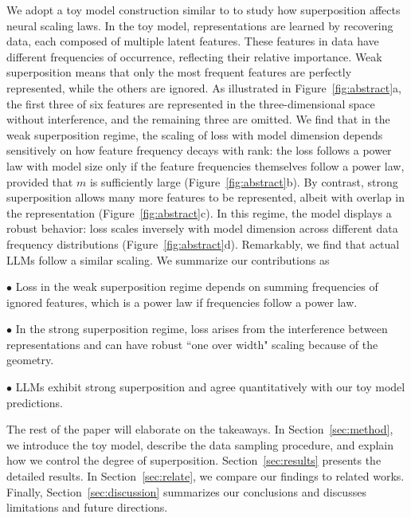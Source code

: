 \documentclass{article}
\begin{document}
We adopt a toy model construction similar to \cite{elhage2022superposition} to study how superposition affects neural scaling laws. In the toy model, representations are learned by recovering data, each composed of multiple latent features. These features in data have different frequencies of occurrence, reflecting their relative importance. Weak superposition means that only the most frequent features are perfectly represented, while the others are ignored. As illustrated in Figure~\ref{fig:abstract}a, the first three of six features are represented in the three-dimensional space without interference, and the remaining three are omitted. We find that in the weak superposition regime, the scaling of loss with model dimension depends sensitively on how feature frequency decays with rank: the loss follows a power law with model size only if the feature frequencies themselves follow a power law, provided that $m$ is sufficiently large (Figure~\ref{fig:abstract}b). By contrast, strong superposition allows many more features to be represented, albeit with overlap in the representation (Figure~\ref{fig:abstract}c). In this regime, the model displays a robust behavior: loss scales inversely with model dimension across different data frequency distributions (Figure~\ref{fig:abstract}d). Remarkably, we find that actual LLMs follow a similar scaling. We summarize our contributions as
\begin{tcolorbox}[colframe=mitred, opacityback=0.9, title=Main results/messages]
$\bullet$ Loss in the weak superposition regime depends on summing frequencies of ignored features, which is a power law if frequencies follow a power law. 

$\bullet$ In the strong superposition regime, loss arises from the interference between representations and can have robust ``one over width" scaling because of the geometry.

$\bullet$ LLMs exhibit strong superposition and agree quantitatively with our toy model predictions.
\end{tcolorbox}

The rest of the paper will elaborate on the takeaways. In Section~\ref{sec:method}, we introduce the toy model, describe the data sampling procedure, and explain how we control the degree of superposition. Section~\ref{sec:results} presents the detailed results. In Section~\ref{sec:relate}, we compare our findings to related works. Finally, Section~\ref{sec:discussion} summarizes our conclusions and discusses limitations and future directions.
\end{document}
